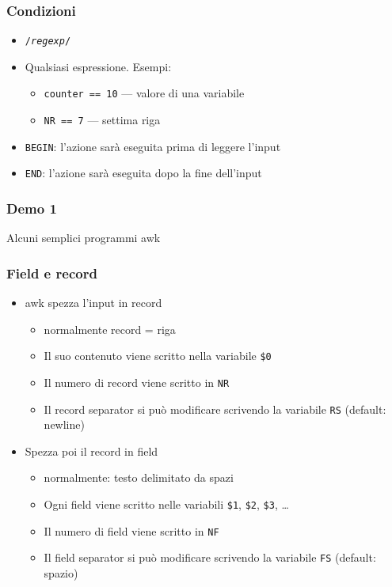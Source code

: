 \documentclass[xetex,table]{beamer}
\begin{document}
\begin{frame}
  \frametitle{Condizioni}
  \begin{itemize}
  \item \texttt{/{\em regexp}/}
  \item Qualsiasi espressione. Esempi:
    \begin{itemize}
    \item \texttt{counter == 10} --- valore di una variabile
    \item \texttt{NR == 7} --- settima riga
    \end{itemize}
  \item \texttt{BEGIN}: l'azione sarà eseguita prima di leggere l'input
  \item \texttt{END}: l'azione sarà eseguita dopo la fine dell'input
  \end{itemize}
\end{frame}

\begin{frame}
  \frametitle{Demo 1}
  \begin{center}
    Alcuni semplici programmi awk
  \end{center}
\end{frame}

\begin{frame}[fragile]
  \frametitle{Field e record}
  \begin{itemize}
  \item awk spezza l'input in record
    \begin{itemize}
    \item normalmente record = riga
    \item Il suo contenuto viene scritto nella variabile \texttt{\$0}
    \item Il numero di record viene scritto in \texttt{NR}
    \item Il record separator si può modificare scrivendo la
      variabile \texttt{RS} (default: newline)
    \end{itemize}
  \item Spezza poi il record in field
    \begin{itemize}
    \item normalmente: testo delimitato da spazi
    \item Ogni field viene scritto nelle variabili \texttt{\$1},
      \texttt{\$2}, \texttt{\$3}, \dots
    \item Il numero di field viene scritto in \texttt{NF}
    \item Il field separator si può modificare scrivendo la variabile
      \texttt{FS} (default: spazio)
    \end{itemize}
  \end{itemize}
\end{frame}
\end{document}

